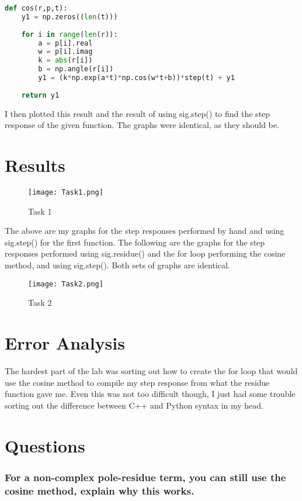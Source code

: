 \documentclass[12pt]{report}
\begin{document}
 \begin{lstlisting}[language=Python]
 def cos(r,p,t):
    y1 = np.zeros((len(t)))
    
    for i in range(len(r)):
        a = p[i].real
        w = p[i].imag
        k = abs(r[i])
        b = np.angle(r[i])
        y1 = (k*np.exp(a*t)*np.cos(w*t+b))*step(t) + y1
        
    return y1
\end{lstlisting}

I then plotted this result and the result of using sig.step() to find the step response of the given function. The graphs were identical, as they should be.
 
 \section{Results}
 
 \begin{figure}[H]
    \centering
    \texttt{[image: Task1.png]}
    \caption{Task 1}
\end{figure}

The above are my graphs for the step responses performed by hand and using sig.step() for the first function. The following are the graphs for the step responses performed using sig.residue() and the for loop performing the cosine method, and using sig.step(). Both sets of graphs are identical. 

\begin{figure}[H]
    \centering
    \texttt{[image: Task2.png]}
    \caption{Task 2}
\end{figure}
 
 \section{Error Analysis}
 
 The hardest part of the lab was sorting out how to create the for loop that would use the cosine method to compile my step response from what the residue function gave me. Even this was not too difficult though, I just had some trouble sorting out the difference between C++ and Python syntax in my head.
 
 \newpage
 \section{Questions}
 \subsubsection{For a non-complex pole-residue term, you can still use the cosine method, explain why this works.}
 
\end{document}
